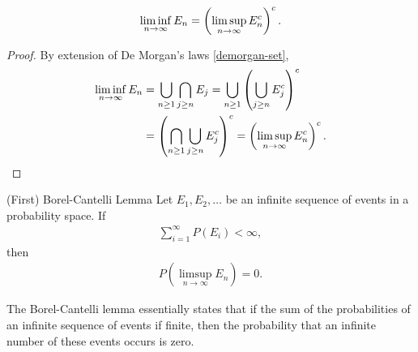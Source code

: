 \begin{prop}\label{set-infimum-supremum-complement}
    \begin{align*}
        \liminf_{n \to \infty}E_n = \left(\limsup_{n \to \infty}E_n^{c}\right)^{c}.
    \end{align*}
\end{prop}

\begin{proof}
    By extension of De Morgan's laws \ref{demorgan-set},
    \begin{align*}
        \liminf_{n \to \infty}E_n &= \bigcup_{n \geq 1}\bigcap_{j \geq n}E_j = \bigcup_{n \geq 1}\left(\bigcup_{j \geq n}E_j^{c}\right)^{c} \\
        &= \left(\bigcap_{n \geq 1}\bigcup_{j \geq n}E_j^{c}\right)^{c} = \left(\limsup_{n \to \infty}E_n^{c}\right)^{c}.
    \end{align*}
\end{proof}

\begin{lemma}{(First) Borel-Cantelli Lemma}\label{borel-cantelli}\proofbreak
    Let $E_1, E_2, \ldots$ be an infinite sequence of events in a probability space. If
    \begin{align*}
        \sum_{i=1}^{\infty}P(E_i) < \infty,
    \end{align*}
    then
    \begin{align*}
        P\left(\limsup_{n \to \infty}E_n\right) = 0.
    \end{align*}
\end{lemma}

\begin{rmk}
    The Borel-Cantelli lemma essentially states that if the sum of the probabilities of an infinite sequence of events if finite, then the probability that an infinite number of these events occurs is zero.
\end{rmk}

